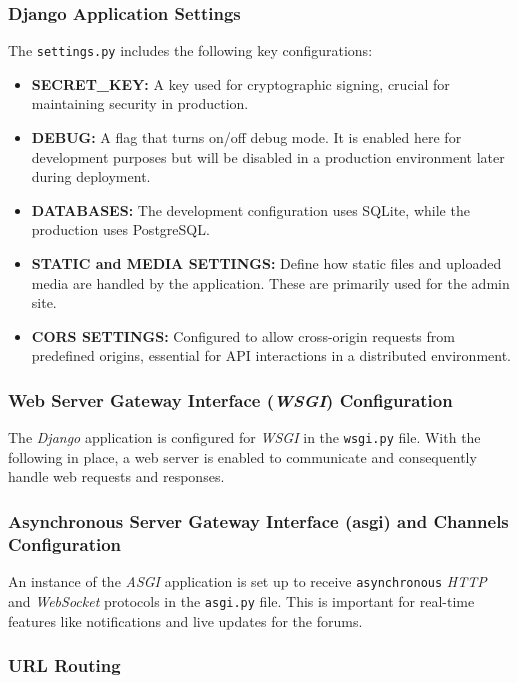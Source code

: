 \subsubsection{Django Application Settings}

The \texttt{settings.py} includes the following key configurations:
\begin{itemize}
    \item \textbf{SECRET\_KEY:} A key used for cryptographic signing, crucial for maintaining security in production.
    \item \textbf{DEBUG:} A flag that turns on/off debug mode. It is enabled here for development purposes but will be disabled in a production environment later during deployment.
    \item \textbf{DATABASES:} The development configuration uses SQLite, while the production uses PostgreSQL.
    \item \textbf{STATIC and MEDIA SETTINGS:} Define how static files and uploaded media are handled by the application. These are primarily used for the admin site. 
    \item \textbf{CORS SETTINGS:} Configured to allow cross-origin requests from predefined origins, essential for API interactions in a distributed environment.
\end{itemize}

\subsubsection{Web Server Gateway Interface (\textit{WSGI}) Configuration}

The \textit{Django} application is configured for \textit{WSGI} in the \texttt{wsgi.py} file. With the following in place, a web server is enabled to communicate and consequently handle web requests and responses.

\subsubsection{Asynchronous Server Gateway Interface (asgi) and Channels Configuration}

An instance of the \textit{ASGI} application is set up to receive \texttt{asynchronous} \textit{HTTP} and \textit{WebSocket} protocols in the \texttt{asgi.py} file. This is important for real-time features like notifications and live updates for the forums.

\subsubsection{URL Routing}


